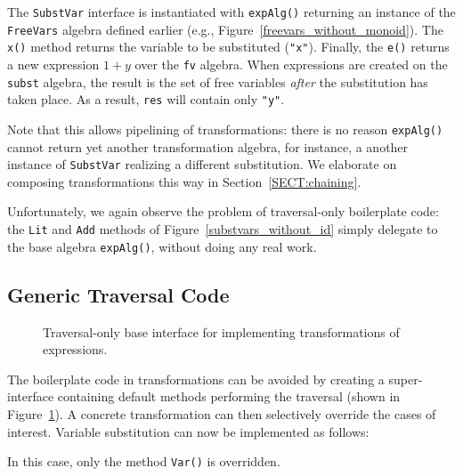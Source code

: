 The \lstinline{SubstVar} interface is instantiated with \lstinline{expAlg()} returning an instance of the \lstinline{FreeVars} algebra defined earlier (e.g., Figure~\ref{freevars_without_monoid}). The \lstinline{x()} method returns the variable to be substituted (\lstinline{"x"}). Finally, the \lstinline{e()} returns a new expression $1+y$ over the \lstinline{fv} algebra.
When expressions are created on the \lstinline{subst} algebra, the result is the set of free variables \textit{after} the substitution has taken place. As a result, \lstinline{res} will contain only \lstinline{"y"}. 

Note that this allows pipelining of transformations: there is no reason
\lstinline{expAlg()} cannot return yet another transformation
algebra, for instance, a another instance of \lstinline{SubstVar} realizing a different substitution. We elaborate on composing transformations this way in Section~\ref{SECT:chaining}.


Unfortunately, we again observe the problem of traversal-only boilerplate code: the
\lstinline{Lit} and \lstinline{Add} methods of Figure~\ref{substvars_without_id} simply delegate to the
base algebra \lstinline{expAlg()}, without doing any real work. 

\subsection{Generic Traversal Code}

\begin{figure}[t]
\nocaptionrule
\caption{Traversal-only base interface for implementing transformations of expressions.}
\label{generic_transform}
\end{figure}

The boilerplate code in transformations can be avoided by creating a
super-interface containing default methods performing the traversal
(shown in Figure~\ref{generic_transform}). A concrete transformation can
then selectively override the cases of interest. Variable substitution
can now be implemented as follows:


\noindent In
this case, only the method \lstinline{Var()} is overridden.


